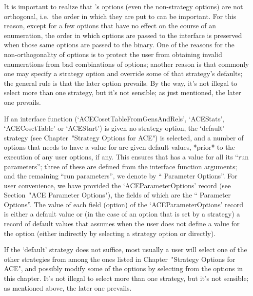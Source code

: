 
It  is  important  to  realize  that  {\ACE}'s   options   (even   the
non-strategy options) are not orthogonal, i.e.\  the  order  in  which
they are put to {\ACE} can be important. For this reason, except for a
few options that have no effect on the course of an  enumeration,  the
order in which options are passed to the {\ACE} interface is preserved
when those same options are passed to the {\ACE} binary.  One  of  the
reasons for the non-orthogonality of options is to  protect  the  user
from obtaining invalid enumerations from bad combinations of  options;
another reason is that commonly one may specify a strategy option  and
override some of that strategy's defaults; the general  rule  is  that
the later option prevails. By the way, it's not illegal to select more
than one strategy, but it's not sensible; as just mentioned, the later
one prevails.


If  an  {\ACE}  interface  function   (`ACECosetTableFromGensAndRels',
`ACEStats',  `ACECosetTable'  or  `ACEStart')  is  given  no  strategy
option, the `default'  strategy  (see  Chapter~"Strategy  Options  for
ACE") is selected, and a number of options that {\ACE} needs to have a
value for are given default values, *prior* to the  execution  of  any
user options, if any. This ensures that {\ACE} has a value for all its
``run parameters'';  three  of  these  are  defined  from  the  {\ACE}
interface function arguments; and the remaining ``run parameters'', we
denote by ``{\ACE} Parameter Options''. For user convenience, we  have
provided the `ACEParameterOptions' record (see Section~"ACE  Parameter
Options"), the fields of which are the ``{\ACE}  Parameter  Options''.
The value of each field (option) of the  `ACEParameterOptions'  record
is either a default value or (in the case of an option that is set  by
a strategy) a record of default values that {\ACE}  assumes  when  the
user does not define a value for  the  option  (either  indirectly  by
selecting a strategy option or directly).

If the `default' strategy does not suffice, most usually a  user  will
select one of the other strategies  from  among  the  ones  listed  in
Chapter~"Strategy Options for ACE", and possibly modify  some  of  the
options by selecting from  the  options  in  this  chapter.  It's  not
illegal to select more than one strategy, but it's  not  sensible;  as
mentioned above, the later one prevails.

